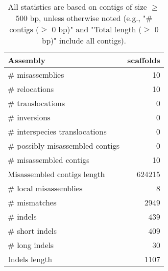 \documentclass[12pt,a4paper]{article}
\begin{document}
\begin{table}[ht]
\begin{center}
\caption{All statistics are based on contigs of size $\geq$ 500 bp, unless otherwise noted (e.g., "\# contigs ($\geq$ 0 bp)" and "Total length ($\geq$ 0 bp)" include all contigs).}
\begin{tabular}{|l*{1}{|r}|}
\hline
Assembly & scaffolds \\ \hline
\# misassemblies & 10 \\ \hline
\hspace{5mm}\# relocations & 10 \\ \hline
\hspace{5mm}\# translocations & 0 \\ \hline
\hspace{5mm}\# inversions & 0 \\ \hline
\hspace{5mm}\# interspecies translocations & 0 \\ \hline
\# possibly misassembled contigs & 0 \\ \hline
\# misassembled contigs & 10 \\ \hline
Misassembled contigs length & 624215 \\ \hline
\# local misassemblies & 8 \\ \hline
\# mismatches & 2949 \\ \hline
\# indels & 439 \\ \hline
\hspace{5mm}\# short indels & 409 \\ \hline
\hspace{5mm}\# long indels & 30 \\ \hline
Indels length & 1107 \\ \hline
\end{tabular}
\end{center}
\end{table}
\end{document}
